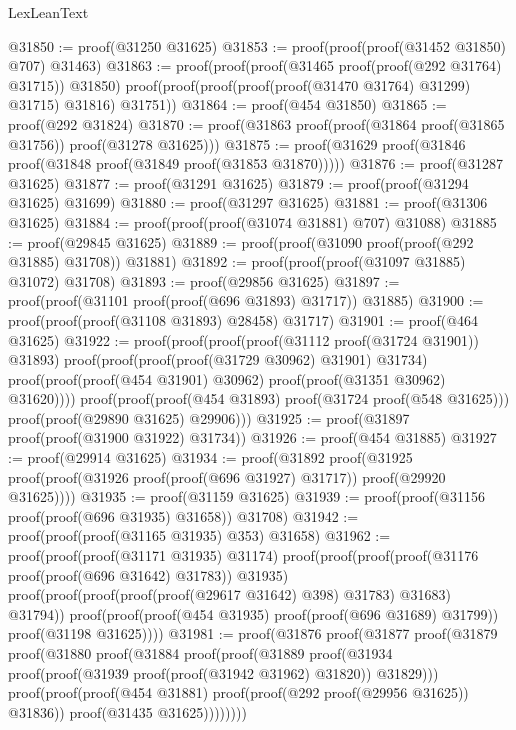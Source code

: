 \begin{lexlean}{LexLeanText}
\begin{coremodule}
@31850 := proof(@31250 @31625)
@31853 := proof(proof(proof(@31452 @31850) @707) @31463)
@31863 := proof(proof(proof(@31465 proof(proof(@292 @31764) @31715)) @31850)
      proof(proof(proof(proof(proof(@31470 @31764) @31299) @31715) @31816) @31751))
@31864 := proof(@454 @31850)
@31865 := proof(@292 @31824)
@31870 := proof(@31863 proof(proof(@31864 proof(@31865 @31756)) proof(@31278 @31625)))
@31875 := proof(@31629 proof(@31846 proof(@31848 proof(@31849 proof(@31853 @31870)))))
@31876 := proof(@31287 @31625)
@31877 := proof(@31291 @31625)
@31879 := proof(proof(@31294 @31625) @31699)
@31880 := proof(@31297 @31625)
@31881 := proof(@31306 @31625)
@31884 := proof(proof(proof(@31074 @31881) @707) @31088)
@31885 := proof(@29845 @31625)
@31889 := proof(proof(@31090 proof(proof(@292 @31885) @31708)) @31881)
@31892 := proof(proof(proof(@31097 @31885) @31072) @31708)
@31893 := proof(@29856 @31625)
@31897 := proof(proof(@31101 proof(proof(@696 @31893) @31717)) @31885)
@31900 := proof(proof(proof(@31108 @31893) @28458) @31717)
@31901 := proof(@464 @31625)
@31922 := proof(proof(proof(proof(@31112 proof(@31724 @31901)) @31893)
        proof(proof(proof(proof(@31729 @30962) @31901) @31734)
            proof(proof(proof(@454 @31901) @30962) proof(proof(@31351 @30962) @31620))))
      proof(proof(proof(@454 @31893) proof(@31724 proof(@548 @31625)))
          proof(proof(@29890 @31625) @29906)))
@31925 := proof(@31897 proof(proof(@31900 @31922) @31734))
@31926 := proof(@454 @31885)
@31927 := proof(@29914 @31625)
@31934 := proof(@31892
      proof(@31925 proof(proof(@31926 proof(proof(@696 @31927) @31717)) proof(@29920 @31625))))
@31935 := proof(@31159 @31625)
@31939 := proof(proof(@31156 proof(proof(@696 @31935) @31658)) @31708)
@31942 := proof(proof(proof(@31165 @31935) @353) @31658)
@31962 := proof(proof(proof(@31171 @31935) @31174)
      proof(proof(proof(proof(@31176 proof(proof(@696 @31642) @31783)) @31935)
            proof(proof(proof(proof(proof(@29617 @31642) @398) @31783) @31683) @31794))
          proof(proof(proof(@454 @31935) proof(proof(@696 @31689) @31799)) proof(@31198 @31625))))
@31981 := proof(@31876
      proof(@31877
          proof(@31879
              proof(@31880
                  proof(@31884
                      proof(proof(@31889
                            proof(@31934
                                proof(proof(@31939 proof(proof(@31942 @31962) @31820)) @31829)))
                          proof(proof(proof(@454 @31881)
                                proof(proof(@292 proof(@29956 @31625)) @31836))
                              proof(@31435 @31625))))))))

\end{coremodule}
\end{lexlean}
